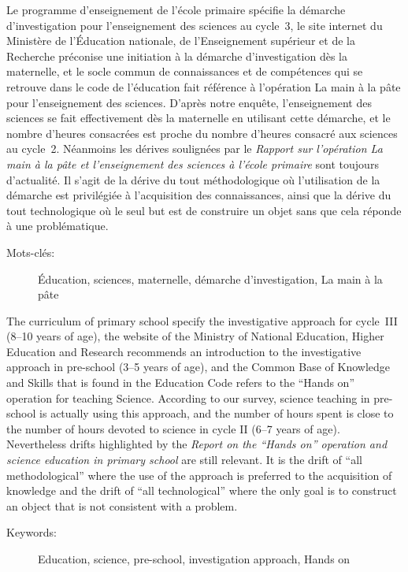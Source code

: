Le programme d’enseignement de l’école primaire spécifie la démarche d’investigation pour l’enseignement des sciences au cycle~3, le site internet du Ministère de l’Éducation nationale, de l’Enseignement supérieur et de la Recherche préconise une initiation à la démarche d’investigation dès la maternelle, et le socle commun de connaissances et de compétences qui se retrouve dans le code de l’éducation fait référence à l’opération \og La main à la pâte \fg{} pour l’enseignement des sciences. D'après notre enquête, l’enseignement des sciences se fait effectivement dès la maternelle en utilisant cette démarche, et le nombre d’heures consacrées est proche du nombre d’heures consacré aux sciences au cycle~2. Néanmoins les dérives soulignées par le \textit{Rapport sur l’opération \og La main à la pâte \fg{} et l’enseignement des sciences à l’école primaire} sont toujours d’actualité. Il s’agit de la dérive du \og tout méthodologique \fg{} où l’utilisation de la démarche est privilégiée à l’acquisition des connaissances, ainsi que la dérive du \og tout technologique \fg{} où le seul but est de construire un objet sans que cela réponde à une problématique.

\begin{description}
\item[Mots-clés:] Éducation, sciences, maternelle, démarche d’investigation, La main à la pâte
\end{description}
\vfill
{}
The curriculum of primary school specify the investigative approach for cycle~III (8–10 years of age), the website of the Ministry of National Education, Higher Education and Research recommends an introduction to the investigative approach in pre-school (3–5 years of age), and the Common Base of Knowledge and Skills that is found in the Education Code refers to the ``Hands on'' operation for teaching Science. According to our survey, science teaching in pre-school is actually using this approach, and the number of hours spent is close to the number of hours devoted to science in cycle II (6–7 years of age). Nevertheless drifts highlighted by the \textit{Report on the ``Hands on'' operation and science education in primary school} are still relevant. It is the drift of ``all methodological'' where the use of the approach is preferred to the acquisition of knowledge and the drift of ``all technological'' where the only goal is to construct an object that is not consistent with a problem.

\begin{description}
\item[Keywords:] Education, science, pre-school, investigation approach, Hands on
\end{description}
\vfill